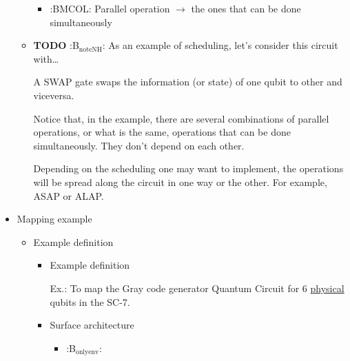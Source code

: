 \begin{itemize}
\begin{itemize}
\begin{itemize}
\begin{center}
{
}
\end{center}

\item :BMCOL:
\label{sec:org633763e}
Parallel operation \(\to\) the ones that can be done simultaneously
\end{itemize}

\item {\bfseries\sffamily TODO} :B\(_{\text{noteNH}}\):
\label{sec:org1ff8c8e}
As an example of scheduling, let's consider this circuit with\ldots{}

A SWAP gate swaps the information (or state) of one qubit to other and viceversa.

Notice that, in the example, there are several combinations of parallel operations,
or what is the same, operations that can be done simultaneously.
They don't depend on each other.

Depending on the scheduling one may want to implement,
the operations will be spread along the circuit in one way or the other.
For example, ASAP or ALAP.
\end{itemize}

\item Mapping example
\label{sec:org000cc39}


\begin{itemize}
\item Example definition
\label{sec:orga876c6c}
\begin{itemize}
\item Example definition
\label{sec:org53c2524}
\begin{center}

Ex.: To map the Gray code generator Quantum Circuit for 6 \uline{physical} qubits in the SC-7.

\end{center}

\item Surface architecture
\label{sec:org9f03e7a}
\begin{itemize}
\item :B\(_{\text{onlyenv}}\):
\label{sec:orgabc1cdf}


\end{itemize}
\end{itemize}
\end{itemize}
\end{itemize}
